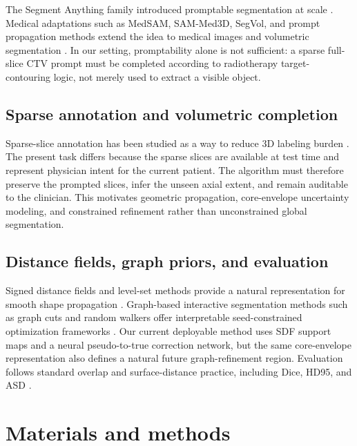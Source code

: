 \documentclass[preprint,12pt]{elsarticle}
\begin{document}
The Segment Anything family introduced promptable segmentation at scale \cite{kirillov2023segmentanything,ravi2024sam2}. Medical adaptations such as MedSAM, SAM-Med3D, SegVol, and prompt propagation methods extend the idea to medical images and volumetric segmentation \cite{ma2024medsam,wang2023sammed3d,du2023segvol,chen2025pam}. In our setting, promptability alone is not sufficient: a sparse full-slice CTV prompt must be completed according to radiotherapy target-contouring logic, not merely used to extract a visible object.

\subsection{Sparse annotation and volumetric completion}

Sparse-slice annotation has been studied as a way to reduce 3D labeling burden \cite{cicek2016threedunet,cai2023crossteaching,zhang2023oneseg}. The present task differs because the sparse slices are available at test time and represent physician intent for the current patient. The algorithm must therefore preserve the prompted slices, infer the unseen axial extent, and remain auditable to the clinician. This motivates geometric propagation, core-envelope uncertainty modeling, and constrained refinement rather than unconstrained global segmentation.

\subsection{Distance fields, graph priors, and evaluation}

Signed distance fields and level-set methods provide a natural representation for smooth shape propagation \cite{osher1988fronts,sethian1996fastmarching,maurer2003distance}. Graph-based interactive segmentation methods such as graph cuts and random walkers offer interpretable seed-constrained optimization frameworks \cite{boykov2001graphcut,grady2006randomwalker}. Our current deployable method uses SDF support maps and a neural pseudo-to-true correction network, but the same core-envelope representation also defines a natural future graph-refinement region. Evaluation follows standard overlap and surface-distance practice, including Dice, HD95, and ASD \cite{dice1945measures,taha2015metrics,maierhein2024metrics}.

\section{Materials and methods}
\end{document}
